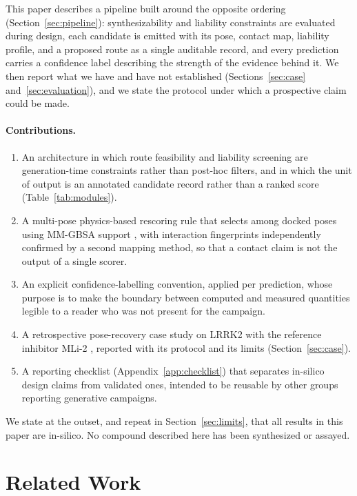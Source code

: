 \documentclass[10pt,twocolumn]{article}
\begin{document}
This paper describes a pipeline built around the opposite ordering
(Section~\ref{sec:pipeline}): synthesizability and liability constraints are
evaluated during design, each candidate is emitted with its pose, contact map,
liability profile, and a proposed route as a single auditable record, and every
prediction carries a confidence label describing the strength of the evidence
behind it. We then report what we have and have not established
(Sections~\ref{sec:case} and~\ref{sec:evaluation}), and we state the protocol
under which a prospective claim could be made.

\paragraph{Contributions.}
\begin{enumerate}
\item An architecture in which route feasibility and liability screening are
generation-time constraints rather than post-hoc filters, and in which the unit
of output is an annotated candidate record rather than a ranked score
(Table~\ref{tab:modules}).
\item A multi-pose physics-based rescoring rule that selects among docked poses
using MM-GBSA support \citep{genheden2015mmpbsa}, with interaction fingerprints
independently confirmed by a second mapping method, so that a contact claim is
not the output of a single scorer.
\item An explicit confidence-labelling convention, applied per prediction,
whose purpose is to make the boundary between computed and measured quantities
legible to a reader who was not present for the campaign.
\item A retrospective pose-recovery case study on LRRK2 with the reference
inhibitor MLi-2 \citep{fell2015mli2}, reported with its protocol and its limits
(Section~\ref{sec:case}).
\item A reporting checklist (Appendix~\ref{app:checklist}) that separates
in-silico design claims from validated ones, intended to be reusable by other
groups reporting generative campaigns.
\end{enumerate}

We state at the outset, and repeat in Section~\ref{sec:limits}, that all
results in this paper are in-silico. No compound described here has been
synthesized or assayed.

\section{Related Work}
\end{document}
